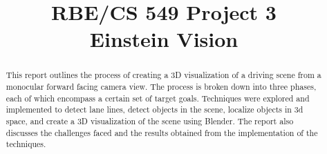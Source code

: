 \documentclass[conference]{IEEEtran}
\begin{document}
\title{
  RBE/CS 549 Project 3\\
  Einstein Vision\\
}

\author{
 \and
{}
}

\maketitle

\begin{abstract}
This report outlines the process of creating a 3D visualization of a driving scene from a monocular forward facing camera view. The process is broken down into three phases, each of which encompass a certain set of target goals. Techniques were explored and implemented to detect lane lines, detect objects in the scene, localize objects in 3d space, and create a 3D visualization of the scene using Blender. The report also discusses the challenges faced and the results obtained from the implementation of the techniques.
\end{abstract}









\printbibliography
\clearpage

\end{document}
